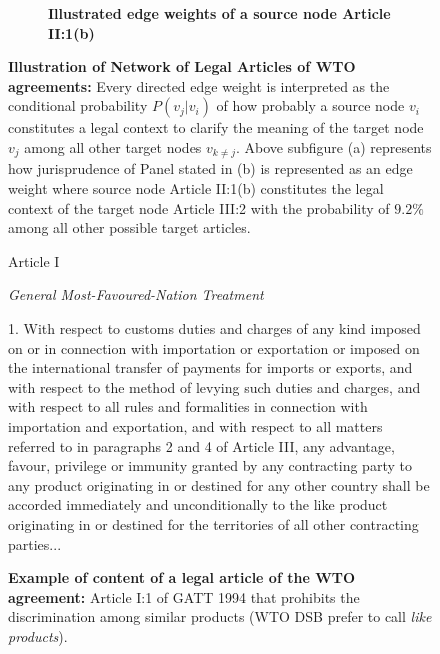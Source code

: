 \begin{figure}[]
    \begin{subfigure}[b]{1\textwidth}
        \centering{
            
        }
        \caption{\textbf{Illustrated edge weights of a source node Article II:1(b)}}
        \label{subfig:a:art2b}
    \end{subfigure}
    \vfill
    \begin{subfigure}[b]{1\textwidth}
    \end{subfigure}
    \caption{\textbf{Illustration of Network of Legal Articles of WTO agreements: }Every directed edge weight is interpreted as the conditional probability $P(v_j|v_i)$ of how probably a source node $v_i$ constitutes a legal context to clarify the meaning of the target node $v_j$ among all other target nodes $v_{k \neq j}$. Above subfigure (a) represents how jurisprudence of Panel stated in (b) is represented as an edge weight where source node Article II:1(b) constitutes the legal context of the target node Article III:2 with the probability of $9.2\%$ among all other possible target articles.}
    \label{fig:def-example}
\end{figure}



\begin{figure}[ht]
    \begin{center}
        Article I
    \end{center}
    \begin{center}
        \textit{General Most-Favoured-Nation Treatment}
    \end{center}
    1. With respect to customs duties and charges of any kind imposed on or in connection
    with importation or exportation or imposed on the international transfer of payments for
    imports or exports, and with respect to the method of levying such duties and charges, and
    with respect to all rules and formalities in connection with importation and exportation, and
    with respect to all matters referred to in paragraphs 2 and 4 of Article III, any advantage,
    favour, privilege or immunity granted by any contracting party to any product originating in
    or destined for any other country shall be accorded immediately and unconditionally to the
    like product originating in or destined for the territories of all other contracting parties...
    \caption{\textbf{Example of content of a legal article of the WTO agreement:} Article I:1 of GATT 1994 that prohibits the discrimination among similar products (WTO DSB prefer to call \textit{like products}).}
    \label{fig:gatt_art1}
\end{figure}



